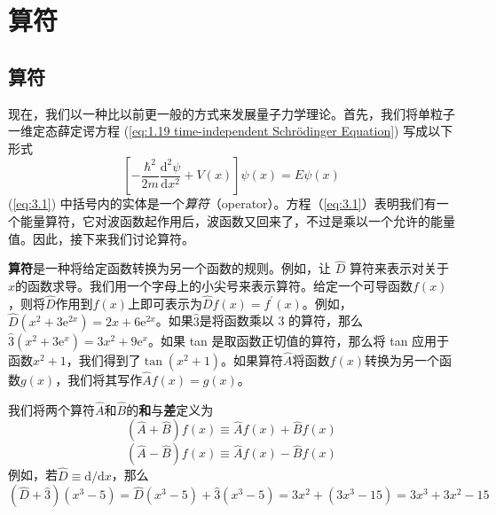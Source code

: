 \chapter{算符}
\label{chap:3}
\section{算符}
	\label{sec:3.1 Operators}
	现在，我们以一种比以前更一般的方式来发展量子力学理论。首先，我们将单粒子一维定态薛定谔方程 (\ref{eq:1.19 time-independent Schrödinger Equation}) 写成以下形式
	\begin{equation}
		\left[-\frac{\hbar^2}{2m}\frac{\mathrm{d}^2\psi}{\mathrm{d}x^2}+V\left(x\right)\right]\psi\left(x\right) = E\psi\left(x\right)
		\label{eq:3.1}
	\end{equation}
	(\ref{eq:3.1}) 中括号内的实体是一个\textit{算符}（operator）。方程（\ref{eq:3.1}）表明我们有一个能量算符，它对波函数起作用后，波函数又回来了，不过是乘以一个允许的能量值。因此，接下来我们讨论算符。

	\textbf{算符}是一种将给定函数转换为另一个函数的规则。例如，让 $\hat{D}$ 算符来表示对关于$x$的函数求导。我们用一个字母上的小尖号来表示算符。给定一个可导函数$f\left(x\right)$，则将$\hat{D}$作用到$f\left(x\right)$上即可表示为$\hat{D}f\left(x\right) = f^{\prime}\left(x\right)$。例如，$\hat{D}\left(x^2+3\mathrm{e}^{2x}\right) = 2x+6\mathrm{e}^{2x}$。如果$\hat{3}$是将函数乘以 3 的算符，那么$\hat{3}\left(x^2+3\mathrm{e}^x\right) = 3x^2+9\mathrm{e}^x$。如果 tan 是取函数正切值的算符，那么将 tan 应用于函数$x^2+1$，我们得到了$\tan\left(x^2+1\right)$。如果算符$\hat{A}$将函数$f\left(x\right)$转换为另一个函数$g\left(x\right)$，我们将其写作$\hat{A}f\left(x\right) = g\left(x\right)$。

	我们将两个算符$\hat{A}$和$\hat{B}$的\textbf{和}与\textbf{差}定义为
	\begin{equation}
		\boxed{
			\left(\hat{A}+\hat{B}\right)f\left(x\right) \equiv \hat{A}f\left(x\right)+\hat{B}f\left(x\right)
		}
		\label{eq:3.2 definition of operators' sum and differenct}
	\end{equation}
	\begin{equation*}
		\left(\hat{A}-\hat{B}\right)f\left(x\right) \equiv \hat{A}f\left(x\right)-\hat{B}f\left(x\right)
	\end{equation*}
	例如，若$\hat{D} \equiv \mathrm{d}/\mathrm{d}x$，那么
	\begin{equation*}
		\left(\hat{D}+\hat{3}\right)\left(x^3-5\right) = \hat{D}\left(x^3-5\right)+ \hat{3}\left(x^3-5\right) = 3x^2+\left(3x^3-15\right) = 3x^3+3x^2-15
	\end{equation*}

